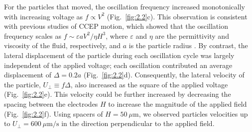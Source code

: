 For the particles that moved, the oscillation frequency increased monotonically with increasing voltage as $f \propto V^{2}$ (Fig.~\ref{fig:2.2}c).
This observation is consistent with previous studies of CCEP motion, which showed that the oscillation frequency scales as $f\sim\varepsilon a V^2 / \eta H^3$, where $\varepsilon$ and $\eta$ are the permittivity and viscosity of the fluid, respectively, and $a$ is the particle radius \autocite{drews2015contact}.
By contrast, the lateral displacement of the particle during each oscillation cycle was largely independent of the applied voltage; each oscillation contributed an average displacement of $\Delta = 0.2 a$ (Fig.~\ref{fig:2.2}d).
Consequently, the lateral velocity of the particle, $U_{\perp}\equiv f\Delta$, also increased as the square of the applied voltage (Fig.~\ref{fig:2.2}e).
This velocity could be further increased by decreasing the spacing between the electrodes $H$ to increase the magnitude of the applied field (Fig.~\ref{fig:2.2}f). 
Using spacers of $H=50~\mu\text{m}$, we observed particles velocities up to $U_{\perp}=600~\mu\text{m/s}$ in the direction perpendicular to the applied field.


